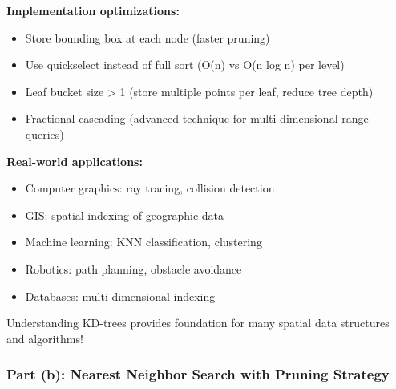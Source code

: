 \documentclass[12pt]{article}
\begin{document}
\begin{explanation}
\textbf{Implementation optimizations:}
\begin{itemize}
    \item Store bounding box at each node (faster pruning)
    \item Use quickselect instead of full sort (O(n) vs O(n log n) per level)
    \item Leaf bucket size > 1 (store multiple points per leaf, reduce tree depth)
    \item Fractional cascading (advanced technique for multi-dimensional range queries)
\end{itemize}

\textbf{Real-world applications:}
\begin{itemize}
    \item Computer graphics: ray tracing, collision detection
    \item GIS: spatial indexing of geographic data
    \item Machine learning: KNN classification, clustering
    \item Robotics: path planning, obstacle avoidance
    \item Databases: multi-dimensional indexing
\end{itemize}

Understanding KD-trees provides foundation for many spatial data structures and algorithms!
\end{explanation}

\newpage
\subsubsection{Part (b): Nearest Neighbor Search with Pruning Strategy}
\end{document}
